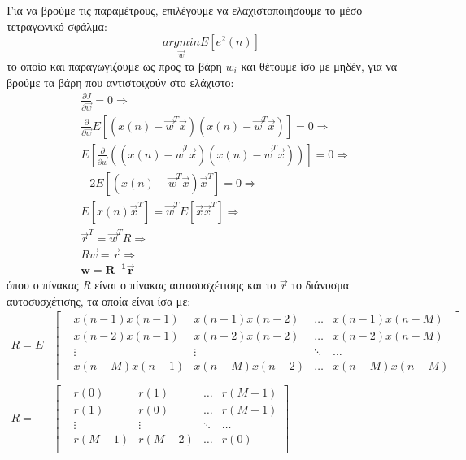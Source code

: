 \par Για να βρούμε τις παραμέτρους, επιλέγουμε να ελαχιστοποιήσουμε το μέσο τετραγωνικό σφάλμα:
\begin{equation}
  \label{eq:min_mse}
  \underset{\vec{w}}{argmin}{E\left[e^2(n)\right]}
\end{equation}
\noindent το οποίο και παραγωγίζουμε ως προς τα βάρη $w_i$ και θέτουμε ίσο με μηδέν, για να βρούμε
τα βάρη που αντιστοιχούν στο ελάχιστο:
\begin{align}
  &\frac{\partial J}{\partial \vec{w}} = 0 \label{eq:weight_calc1} \Rightarrow \\
  &\frac{\partial}{\partial \vec{w}}E[\left(x(n) - \vec{w}^T\vec{x}\right)\left(x(n) - \vec{w}^T\vec{x}\right)] = 0
  \label{eq:weight_calc2} \Rightarrow \\
  &E\left[\frac{\partial}{\partial \vec{w}}(\left(x(n) - \vec{w}^T\vec{x}\right)\left(x(n) -
      \vec{w}^T\vec{x}\right))\right] = 0 \label{eq:weight_calc3} \Rightarrow \\
  &-2E\left[(x(n) - \vec{w}^T\vec{x})\vec{x}^T\right]=0 \label{eq:weight_calc4}\Rightarrow \\
  &E[x(n)\vec{x}^T] = \vec{w}^TE[\vec{x}\vec{x}^T] \label{eq:weight_calc5} \Rightarrow \\
  &\vec{r}^T = \vec{w}^TR \label{eq:weight_calc6} \Rightarrow \\
  &R\vec{w}  = \vec{r} \label{eq:weight_calc7} \Rightarrow \\
  &\bm{\boxed{w = R^{-1}\vec{r}}}\label{eq:weight_calc8}
\end{align}
\noindent όπου ο πίνακας \emph{R} είναι ο πίνακας αυτοσυσχέτισης και το $\vec{r}$ το διάνυσμα
αυτοσυσχέτισης, τα οποία είναι ίσα με:
\begin{align}
  \label{eq:autocorr_mat}
  R = E&\begin{bmatrix}
    &x(n-1)x(n-1) & x(n-1)x(n-2) & \ldots & x(n-1)x(n-M) \\
    &x(n-2)x(n-1) & x(n-2)x(n-2) & \ldots & x(n-2)x(n-M) \\
    &\vdots &\vdots &\ddots & \ldots \\
    &x(n-M)x(n-1) & x(n-M)x(n-2) & \ldots & x(n-M)x(n-M) \\
  \end{bmatrix} \\
  R = &\begin{bmatrix}
    &r(0) & r(1) & \ldots & r(M - 1) \\
    &r(1) & r(0) & \ldots & r(M - 1) \\
    &\vdots &\vdots &\ddots & \ldots \\
    &r(M - 1) & r(M-2) & \ldots & r(0) \\
  \end{bmatrix}
\end{align}

